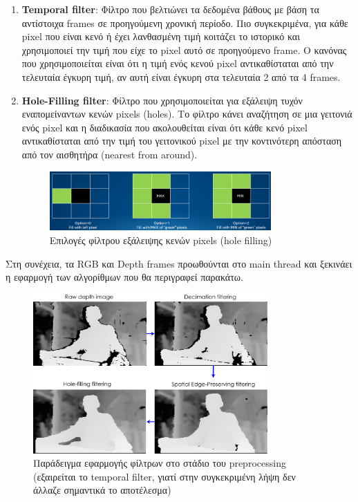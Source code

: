 \begin{enumerate}
    \item \textbf{Temporal filter}: Φίλτρο που βελτιώνει τα δεδομένα βάθους με βάση τα αντίστοιχα frames σε προηγούμενη χρονική περίοδο. Πιο συγκεκριμένα, για κάθε pixel που είναι κενό ή έχει λανθασμένη τιμή κοιτάζει το ιστορικό και χρησιμοποιεί την τιμή που είχε το pixel αυτό σε προηγούμενο frame. Ο κανόνας που χρησιμοποιείται είναι ότι η τιμή ενός κενού pixel αντικαθίσταται από την τελευταία έγκυρη τιμή, αν αυτή είναι έγκυρη στα τελευταία 2 από τα 4 frames.
    \item \textbf{Hole-Filling filter}: Φίλτρο που χρησιμοποιείται για εξάλειψη τυχόν εναπομείναντων κενών pixels (holes). Το φίλτρο κάνει αναζήτηση σε μια γειτονιά ενός pixel και η διαδικασία που ακολουθείται είναι ότι κάθε κενό pixel αντικαθίσταται από την τιμή του γειτονικού pixel με την κοντινότερη απόσταση από τον αισθητήρα (nearest from around).
    \begin{figure}[H]
        \centering
        \includegraphics[width=0.8\textwidth]{images/hole_filling.png}
        \caption{Επιλογές φίλτρου εξάλειψης κενών pixels (hole filling)}
        \label{fig:hole-filling}
    \end{figure}
\end{enumerate}

Στη συνέχεια, τα RGB και Depth frames προωθούνται στο main thread και ξεκινάει η εφαρμογή των αλγορίθμων που θα περιγραφεί παρακάτω.

\begin{figure}[H]
    \centering
    \includegraphics[width=0.8\textwidth]{images/preprocessing.png}
    \caption{Παράδειγμα εφαρμογής φίλτρων στο στάδιο του preprocessing (εξαιρείται το temporal filter, γιατί στην συγκεκριμένη λήψη δεν άλλαζε σημαντικά το αποτέλεσμα)}
    \label{fig:preprocessing}
\end{figure}

